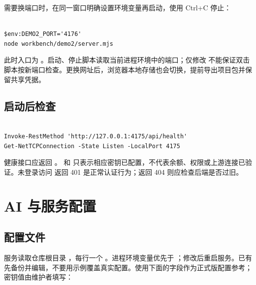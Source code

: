 \documentclass[UTF8,fontset=windows,zihao=-4,a4paper]{ctexart}
\begin{document}
需要换端口时，在同一窗口明确设置环境变量再启动，使用 Ctrl+C 停止：



\begin{Verbatim}[fontsize=\small,breaklines=true,breakanywhere=true,frame=single,rulecolor=\color{Rule},framesep=7pt]

$env:DEMO2_PORT='4176'
node workbench/demo2/server.mjs

\end{Verbatim}

此时入口为 {\def\UrlBreaks{\do\/}}。启动、停止脚本读取当前进程环境中的端口；仅修改  不能保证双击脚本按新端口检查。更换网址后，浏览器本地存储也会切换，提前导出项目包并保留共享凭据。


\subsection*{启动后检查}


\begin{Verbatim}[fontsize=\small,breaklines=true,breakanywhere=true,frame=single,rulecolor=\color{Rule},framesep=7pt]

Invoke-RestMethod 'http://127.0.0.1:4175/api/health'
Get-NetTCPConnection -State Listen -LocalPort 4175

\end{Verbatim}

健康接口应返回 。 和  只表示相应密钥已配置，不代表余额、权限或上游连接已验证。未登录访问  返回 401 是正常认证行为；返回 404 则应检查后端是否过旧。


\section{AI 与服务配置}\label{sec:2}

\subsection*{配置文件}

服务读取仓库根目录 ，每行一个 。进程环境变量优先于 ；修改后重启服务。已有  先备份并编辑，不要用示例覆盖真实配置。使用下面的字段作为正式版配置参考；密钥值由维护者填写：
\end{document}
